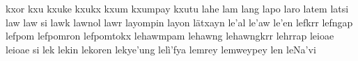 kxor\hspace{2mm}
kxu\hspace{2mm}
kxuke\hspace{2mm}
kxukx\hspace{2mm}
kxum\hspace{2mm}
kxumpay\hspace{2mm}
kxutu\hspace{2mm}
lahe\hspace{2mm}
lam\hspace{2mm}
lang\hspace{2mm}
lapo\hspace{2mm}
laro\hspace{2mm}
latem\hspace{2mm}
latsi\hspace{2mm}
law\hspace{2mm}
law si\hspace{2mm}
lawk\hspace{2mm}
lawnol\hspace{2mm}
lawr\hspace{2mm}
layompin\hspace{2mm}
layon\hspace{2mm}
lätxayn\hspace{2mm}
le'al\hspace{2mm}
le'aw\hspace{2mm}
le'en\hspace{2mm}
lefkrr\hspace{2mm}
lefngap\hspace{2mm}
lefpom\hspace{2mm}
lefpomron\hspace{2mm}
lefpomtokx\hspace{2mm}
lehawmpam\hspace{2mm}
lehawng\hspace{2mm}
lehawngkrr\hspace{2mm}
lehrrap\hspace{2mm}
leioae\hspace{2mm}
leioae si\hspace{2mm}
lek\hspace{2mm}
lekin\hspace{2mm}
lekoren\hspace{2mm}
lekye'ung\hspace{2mm}
lelì'fya\hspace{2mm}
lemrey\hspace{2mm}
lemweypey\hspace{2mm}
len\hspace{2mm}
leNa'vi\hspace{2mm}
